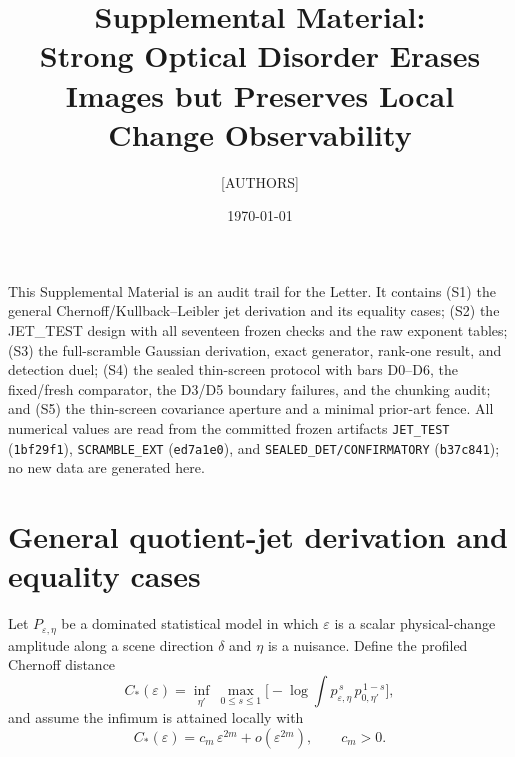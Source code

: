 \documentclass[aps,prl,onecolumn,notitlepage,nofootinbib,superscriptaddress]{revtex4-2}
\newcommand{\Cstar}{C_{\ast}}
\newcommand{\eps}{\varepsilon}
\begin{document}
\title{Supplemental Material:\\
Strong Optical Disorder Erases Images but Preserves Local Change Observability}
\author{[AUTHORS]}
\affiliation{[AFFILIATION]}
\date{\today}
\maketitle

\noindent
This Supplemental Material is an audit trail for the Letter. It contains
(S1) the general Chernoff/Kullback--Leibler jet derivation and its equality
cases; (S2) the JET\_TEST design with all seventeen frozen checks and the raw
exponent tables; (S3) the full-scramble Gaussian derivation, exact generator,
rank-one result, and detection duel; (S4) the sealed thin-screen protocol with
bars D0--D6, the fixed/fresh comparator, the D3/D5 boundary failures, and the
chunking audit; and (S5) the thin-screen covariance aperture and a minimal
prior-art fence. All numerical values are read from the committed frozen
artifacts \texttt{JET\_TEST} (\texttt{1bf29f1}), \texttt{SCRAMBLE\_EXT}
(\texttt{ed7a1e0}), and \texttt{SEALED\_DET/CONFIRMATORY} (\texttt{b37c841}); no
new data are generated here.

\section{General quotient-jet derivation and equality cases}
Let $P_{\eps,\eta}$ be a dominated statistical model in which $\eps$ is a scalar
physical-change amplitude along a scene direction $\delta$ and $\eta$ is a
nuisance. Define the profiled Chernoff distance
\begin{equation}
\Cstar(\eps)=\inf_{\eta'}\ \max_{0\le s\le1}
\Big[-\log\!\int p_{\eps,\eta}^{\,s}\,p_{0,\eta'}^{\,1-s}\Big],
\label{eq:s_cstar}
\end{equation}
and assume the infimum is attained locally with
\begin{equation}
\Cstar(\eps)=c_m\,\eps^{2m}+o(\eps^{2m}),\qquad c_m>0 .
\label{eq:s_contact}
\end{equation}
\end{document}
